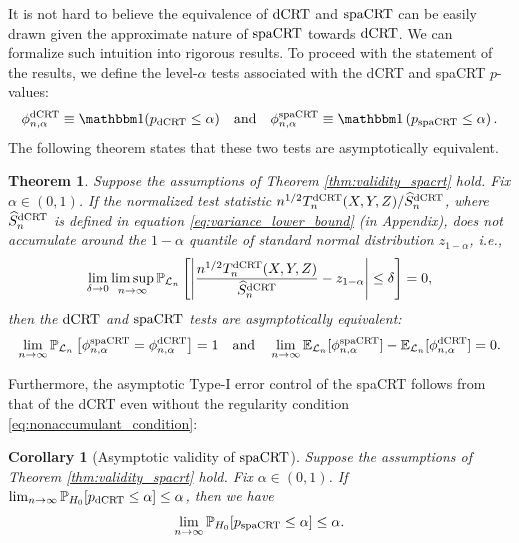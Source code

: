 \documentclass[12pt]{article}
\newtheorem{theorem}{Theorem}
\newtheorem{corollary}{Corollary}
\theoremstyle{definition}
\def\P{\mathbb{P}}
\def\P{\mathbb{P}}
\newcommand{\E}{\mathbb E}								%
\renewcommand{\P}{\mathbb{P}}							%
\newcommand{\indicator}{\mathbbm 1}						%
\newcommand{\srx}{X}									%
\newcommand{\srz}{Z}									%
\newcommand{\sry}{Y}									%
\newcommand{\law}{\mathcal L}							%
\newcommand{\dCRT}{\textnormal{dCRT}} 					%
\newcommand{\spacrt}{\textnormal{spaCRT}}               %
\begin{document}
It is not hard to believe the equivalence of $\dCRT$ and $\spacrt$ can be easily drawn given the approximate nature of $\spacrt$ towards $\dCRT$. We can formalize such intuition into rigorous results. To proceed with the statement of the results, we define the level-$\alpha$ tests associated with the dCRT and spaCRT $p$-values:
\begin{align*}
\phi^{\dCRT}_{n,\alpha} \equiv \indicator(p_{\dCRT} \leq \alpha) \quad \text{and} \quad	\phi^{\spacrt}_{n,\alpha}\equiv \indicator\left(p_{\spacrt} \leq \alpha\right).
\end{align*}
The following theorem states that these two tests are asymptotically equivalent.

\begin{theorem}\label{thm:asymptotic_equivalence}
	Suppose the assumptions of Theorem \ref{thm:validity_spacrt} hold. Fix $\alpha\in (0,1)$. If the normalized test statistic $n^{1/2}T_n^{\dCRT}(\srx,\sry,\srz)/\widehat{S}_n^{\dCRT}$, where $\widehat{S}_n^{\dCRT}$ is defined {\color{red} in equation \eqref{eq:variance_lower_bound} (in Appendix)}, does not accumulate around the $1-\alpha$ quantile of standard normal distribution $z_{1-\alpha}$, i.e.,
  \begin{align}\label{eq:nonaccumulant_condition}
    \lim_{\delta\rightarrow0}\limsup_{n\rightarrow\infty}\P_{\law_n}\left[\left|\frac{n^{1/2}T_n^{\dCRT}(\srx,\sry,\srz)}{\widehat{S}_n^{\dCRT}}-z_{1-\alpha}\right|\leq \delta\right]=0,
  \end{align}
  then the $\dCRT$ and $\spacrt$ tests are asymptotically equivalent:
  \begin{align*}
    \lim_{n\rightarrow\infty}\P_{\law_n}\left[\phi_{n,\alpha}^{\spacrt}=\phi_{n,\alpha}^{\dCRT}\right]=1 \quad \text{and} \quad \lim_{n\rightarrow\infty}\E_{\law_n}[\phi_{n,\alpha}^{\spacrt}]-\E_{\law_n}[\phi_{n,\alpha}^{\dCRT}]=0.
  \end{align*}
\end{theorem}
\noindent Furthermore, the asymptotic Type-I error control of the spaCRT follows from that of the dCRT even without the regularity condition \eqref{eq:nonaccumulant_condition}:

\begin{corollary}[Asymptotic validity of $\spacrt$]\label{cor:asymptotic_validity_spacrt}
  Suppose the assumptions of Theorem \ref{thm:validity_spacrt} hold. Fix $\alpha\in (0,1)$. If $\lim_{n\rightarrow\infty}\P_{H_0}[p_{\dCRT}\leq \alpha]\leq \alpha$, then we have 
  \begin{align*}
    \lim_{n\rightarrow\infty}\P_{H_0}[p_{\spacrt}\leq \alpha]\leq \alpha.
  \end{align*}
\end{corollary}
\end{document}
